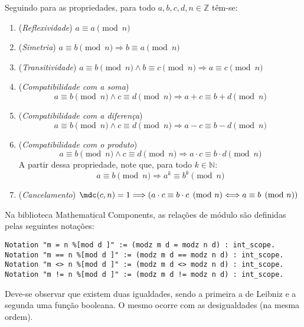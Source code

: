     Seguindo para as propriedades, para todo $a,b, c, d, n \in \mathbb{Z}$ têm-se:
\begin{enumerate}
    \item (\textit{Reflexividade}) $a \equiv a \pmod{n}$
    \item (\textit{Simetria}) $a \equiv b \pmod{n} \Longrightarrow b \equiv a \pmod{n}$
    \item (\textit{Transitividade}) $a \equiv b \pmod{n} \land b \equiv c \pmod{n} \Longrightarrow a \equiv c \pmod{n}$
    \item (\textit{Compatibilidade com a soma})
    \begin{equation*}
        a \equiv b \pmod{n} \land c \equiv d \pmod{n} \Longrightarrow a + c \equiv b + d \pmod{n}
    \end{equation*}
    \item (\textit{Compatibilidade com a diferença})
    \begin{equation*}
        a \equiv b \pmod{n} \land c \equiv d \pmod{n} \Longrightarrow a - c \equiv b - d \pmod{n}
    \end{equation*}
    \item \label{item:propcong6-produto} (\textit{Compatibilidade com o produto})
    \begin{equation*}
        a \equiv b \pmod{n} \land c \equiv d \pmod{n} \Longrightarrow a \cdot c \equiv b \cdot d \pmod{n}
    \end{equation*}
    A partir dessa propriedade, note que, para todo $k \in \mathbb{N}$:
    \begin{equation*}
        a \equiv b \pmod{n} \Longrightarrow a^k \equiv b^k \pmod{n}
    \end{equation*}
    \item \label{item:propcong7-cancelamento} (\textit{Cancelamento}) $\mdc(c, n) = 1 \Longrightarrow (a \cdot c \equiv b \cdot c \pmod{n} \Longleftrightarrow a \equiv b \pmod{n})$   
\end{enumerate}

Na biblioteca Mathematical Components, as relações de módulo são definidas pelas seguintes notações:
    \begin{lstlisting}[language=coq,frame=single,tabsize=1]
Notation "m = n %[mod d ]" := (modz m d = modz n d) : int_scope.
Notation "m == n %[mod d ]" := (modz m d == modz n d) : int_scope.
Notation "m <> n %[mod d ]" := (modz m d <> modz n d) : int_scope.
Notation "m != n %[mod d ]" := (modz m d != modz n d) : int_scope.
    \end{lstlisting}
Deve-se observar que existem duas igualdades, sendo a primeira a de Leibniz e a segunda uma função booleana. O mesmo ocorre com as desigualdades (na mesma ordem).

